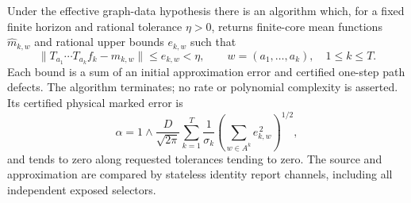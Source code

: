 \begin{theorem}
\label{thm:v15-enriched}
Under the effective graph-data hypothesis there is an algorithm which,
for a fixed finite horizon and rational tolerance $\eta>0$, returns
finite-core mean functions $\widehat m_{k,w}$ and rational upper bounds
$e_{k,w}$ such that
\begin{equation}\label{eq:v15-enriched-word}
 \|T_{a_1}\cdots T_{a_k}f_k-\widehat m_{k,w}\|\le e_{k,w}<\eta,
             \qquad w=(a_1,\ldots,a_k),\quad 1\le k\le T.
\end{equation}
Each bound is a sum of an initial approximation error and certified
one-step path defects. The algorithm terminates; no rate or polynomial
complexity is asserted. Its certified physical marked error is
\begin{equation}\label{eq:v15-enriched-physical}
 \alpha=1\wedge\frac{D}{\sqrt{2\pi}}
       \sum_{k=1}^T\frac1{\sigma_k}
          \left(\sum_{w\in A^k}e_{k,w}^{\,2}\right)^{1/2},
\end{equation}
and tends to zero along requested tolerances tending to zero.
The source and approximation are compared by stateless identity
report channels, including all independent exposed selectors.
\end{theorem}
